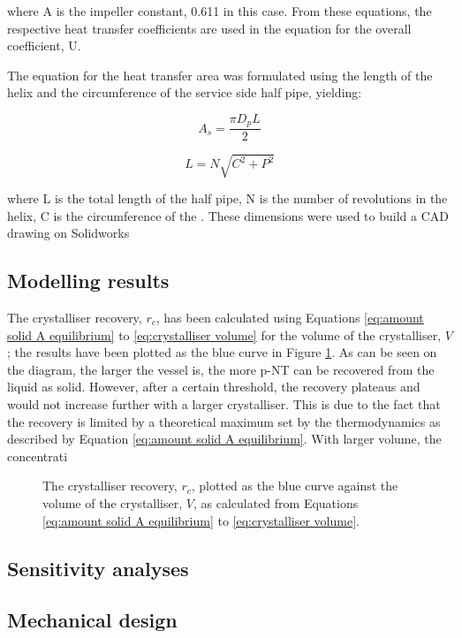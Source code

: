 where A is the impeller constant, 0.611 in this case. From these equations, the respective heat transfer coefficients are used in the equation for the overall coefficient, U.



The equation for the heat transfer area was formulated using the length of the helix and the circumference of the service side half pipe, yielding:

\begin{equation} \label{eq:coolantpipesa}
    A_s = \frac{\pi D_p L}{2}
    \end{equation}
    
\begin{equation}\label{eq:helixlength}
    L = N \sqrt{C^2 + P^2}
\end{equation}

where L is the total length of the half pipe, N is the number of revolutions in the helix, C is the circumference of the . These dimensions were used to build a CAD drawing on Solidworks




\subsection{Modelling results}

The crystalliser recovery, $r_c$, has been calculated using Equations \ref{eq:amount solid A equilibrium} to \ref{eq:crystalliser volume} for the volume of the crystalliser, $V$; the results have been plotted as the blue curve in Figure \ref{fig:recovery vs volume crystalliser}. As can be seen on the diagram, the larger the vessel is, the more p-NT can be recovered from the liquid as solid. However, after a certain threshold, the recovery plateaus and would not increase further with a larger crystalliser. This is due to the fact that the recovery is limited by a theoretical maximum set by the thermodynamics as described by Equation \ref{eq:amount solid A equilibrium}. With larger volume, the concentrati

\begin{figure}[h]
    \centering
    
    \caption{The crystalliser recovery, $r_c$, plotted as the blue curve against the volume of the crystalliser, $V$, as calculated from Equations \ref{eq:amount solid A equilibrium} to \ref{eq:crystalliser volume}. }
    \label{fig:recovery vs volume crystalliser}
\end{figure}

\subsection{Sensitivity analyses}

\subsection{Mechanical design}

